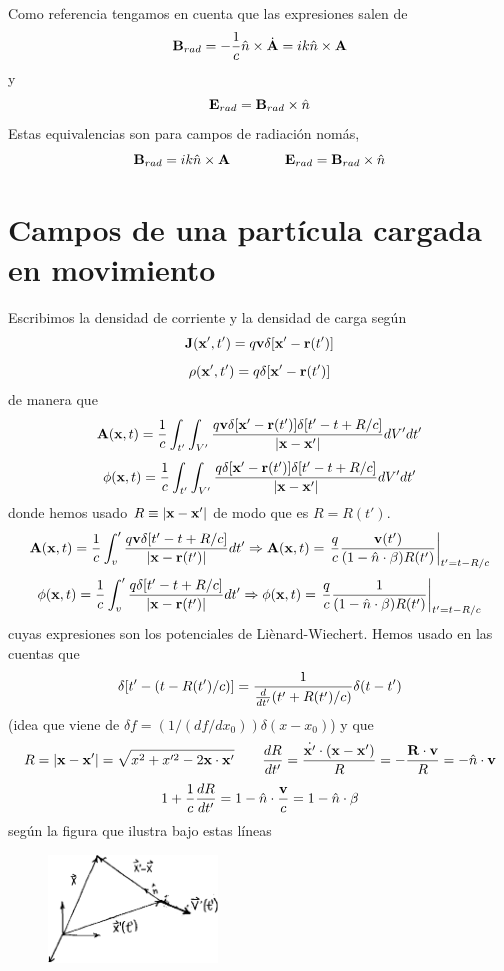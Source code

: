 \documentclass[10pt,oneside]{CBFT_book}
\begin{document}
Como referencia tengamos en cuenta que las expresiones salen de 
\[
	\vb{B}_{rad} = -\frac{1}{c} \hat{n} \times \dot{\vb{A}} = ik \hat{n} \times \vb{A} 
\]
y
\[
	\vb{E}_{rad} = \vb{B}_{rad} \times \hat{n}
\]
Estas equivalencias son para campos de radiación nomás,
\[
	\vb{B}_{rad} = ik \hat{n} \times \vb{A} \qquad \qquad \vb{E}_{rad} = \vb{B}_{rad} \times \hat{n}
\]

\section{Campos de una partícula cargada en movimiento}

Escribimos la densidad de corriente y la densidad de carga según
\[
	\vb{J}(\vb{x}',t') = q\vb{v} \delta[ \vb{x}' - \vb{r}(t')]
\]
\[
	\rho(\vb{x}',t') = q \delta[ \vb{x}' - \vb{r}(t')]
\]
de manera que 
\[
	\vb{A}(\vb{x},t) = \frac{1}{c} \int_{t'}\int_{V'} 
	\frac{ q\vb{v} \delta[ \vb{x}' - \vb{r}(t')] \delta[ t'-t +R/c] }{|\vb{x} -\vb{x}'|} dV' dt'
\]
\[
	\phi(\vb{x},t) = \frac{1}{c} \int_{t'}\int_{V'} 
	\frac{ q \delta[ \vb{x}' - \vb{r}(t')] \delta[ t'-t +R/c] }{|\vb{x} -\vb{x}'|} dV' dt'
\]
donde hemos usado $R\equiv |\vb{x}-\vb{x}'|$ de modo que es $R = R(t')$.
\[
	\vb{A}(\vb{x},t) = \frac{1}{c} \int_v' \frac{ q\vb{v} \delta[ t'-t +R/c] }{|\vb{x} -\vb{r}(t')|} dt' 
	\Rightarrow \vb{A}(\vb{x},t) = \left. \frac{q}{c} \frac{\vb{v}(t')}
	{(1-\hat{n}\cdot{\vb{\beta}})R(t')} \right|_{t'=t-R/c}
\]
\[
	\phi(\vb{x},t) = \frac{1}{c} \int_v' \frac{q \delta[ t'-t +R/c]}{|\vb{x} -\vb{r}(t')|} dt' 
	\Rightarrow \phi(\vb{x},t) = \left. \frac{q}{c} \frac{1}{(1-\hat{n}\cdot{\vb{\beta}})R(t')} 
	\right|_{t'=t-R/c}
\]
cuyas expresiones son los potenciales de Liènard-Wiechert. Hemos usado en las cuentas que 
\[
	\delta[t' - ( t - R(t')/c )] = \frac{1}{\frac{d^{\hspace{-0.05em}} {}}{d {t'}^{\hspace{-0.05em}}}( t' + R(t')/c )} \delta( t-t')
\]
(idea que viene de $\delta f = (1/(df/dx_0)) \delta(x-x_0) $) y que 
\[
	R = |\vb{x}-\vb{x}'| = \sqrt{ x^2 + x'^2 - 2\pe{x}{x'} } \qquad \dtot{R}{t'} = 
	\frac{\dot{\vb{x}'}\cdot(\vb{x}-\vb{x}')}{R} = -\frac{\pe{R}{v}}{R} = -\hat{n}\cdot\vb{v}
\]
\[
	1 + \frac{1}{c} \dtot{R}{t'}  = 1 -\hat{n}\cdot\frac{\vb{v}}{c} = 1 - \hat{n}\cdot\vb{\beta}
\]
según la figura que ilustra bajo estas líneas

\begin{figure}[htb]
	\begin{center}
	\includegraphics[width=0.4\textwidth]{images/fig_ft1_campo_part_car.pdf}	 
	\end{center}
	\caption{}
\end{figure} 
\end{document}
